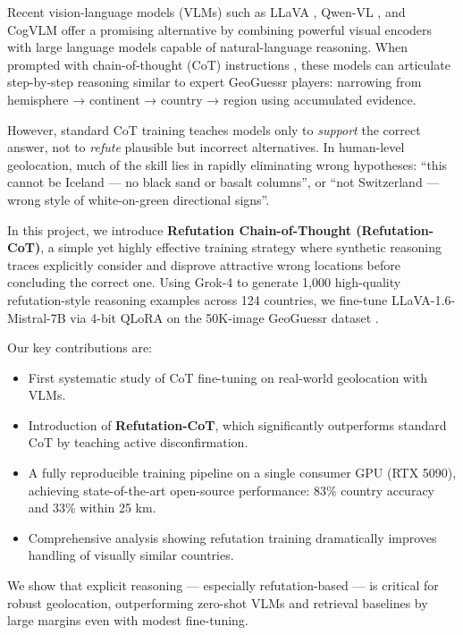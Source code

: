 \documentclass[11pt,a4paper]{article}
\begin{document}
Recent vision-language models (VLMs) such as LLaVA \cite{liu2024llava}, Qwen-VL \cite{bai2023qwen}, and CogVLM \cite{hong2024cogvlm} offer a promising alternative by combining powerful visual encoders with large language models capable of natural-language reasoning. When prompted with chain-of-thought (CoT) instructions \cite{wei2022chain}, these models can articulate step-by-step reasoning similar to expert GeoGuessr players: narrowing from hemisphere → continent → country → region using accumulated evidence.

However, standard CoT training teaches models only to \emph{support} the correct answer, not to \emph{refute} plausible but incorrect alternatives. In human-level geolocation, much of the skill lies in rapidly eliminating wrong hypotheses: “this cannot be Iceland — no black sand or basalt columns”, or “not Switzerland — wrong style of white-on-green directional signs”.

In this project, we introduce \textbf{Refutation Chain-of-Thought (Refutation-CoT)}, a simple yet highly effective training strategy where synthetic reasoning traces explicitly consider and disprove attractive wrong locations before concluding the correct one. Using Grok-4 to generate 1,000 high-quality refutation-style reasoning examples across 124 countries, we fine-tune LLaVA-1.6-Mistral-7B via 4-bit QLoRA on the 50K-image GeoGuessr dataset \cite{ubitquitin2024geolocation}. 

Our key contributions are:
\begin{itemize}
    \item First systematic study of CoT fine-tuning on real-world geolocation with VLMs.
    \item Introduction of \textbf{Refutation-CoT}, which significantly outperforms standard CoT by teaching active disconfirmation.
    \item A fully reproducible training pipeline on a single consumer GPU (RTX 5090), achieving state-of-the-art open-source performance: 83\% country accuracy and 33\% within 25 km.
    \item Comprehensive analysis showing refutation training dramatically improves handling of visually similar countries.
\end{itemize}

We show that explicit reasoning — especially refutation-based — is critical for robust geolocation, outperforming zero-shot VLMs and retrieval baselines by large margins even with modest fine-tuning.
\end{document}

